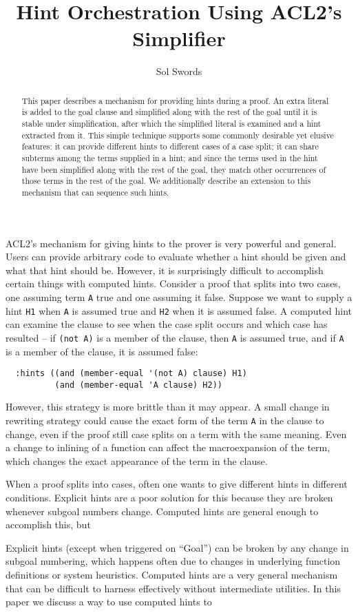 \documentclass[submission,copyright,creativecommons]{eptcs}
\title{Hint Orchestration Using ACL2's Simplifier}
\author{Sol Swords
\institute{Centaur Techology, Inc.\\
Austin, TX, USA}
\email{sswords@centtech.com}
}
\begin{document}
\maketitle

\begin{abstract}
  This paper describes a mechanism for providing hints during a proof.
  An extra literal is added to the goal clause and simplified along
  with the rest of the goal until it is stable under simplification,
  after which the simplified literal is examined and a hint extracted
  from it.  This simple technique supports some commonly desirable yet
  elusive features: it can provide different hints to different cases
  of a case split; it can share subterms among the terms supplied in a
  hint; and since the terms used in the hint have been simplified
  along with the rest of the goal, they match other occurrences of
  those terms in the rest of the goal.  We additionally describe an
  extension to this mechanism that can sequence such hints.

\end{abstract}


ACL2's mechanism for giving hints to the prover is very powerful and
general.  Users can provide arbitrary code to evaluate whether a hint
should be given and what that hint should be.  However, it is
surprisingly difficult to accomplish certain things with computed
hints.  Consider a proof that splits into two cases, one assuming term
\texttt{A} true and one assuming it false.  Suppose we want to supply
a hint \texttt{H1} when \texttt{A} is assumed true and
\texttt{H2} when it is assumed false.  A computed hint can examine the
clause to see when the case split occurs and which case has resulted
-- if \texttt{(not A)} is a member of the clause, then \texttt{A} is
assumed true, and if \texttt{A} is a member of the clause, it is
assumed false:
\begin{verbatim}
  :hints ((and (member-equal '(not A) clause) H1)
          (and (member-equal 'A clause) H2))
\end{verbatim}
However, this strategy is more brittle than it may appear.  A small
change in rewriting strategy could cause the exact form of the term
\texttt{A} in the clause to change, even if the proof still case
splits on a term with the same meaning.  Even a change to inlining of
a function can affect the macroexpansion of the term, which changes
the exact appearance of the term in the clause.




  When a proof splits
into cases, often one wants to give different hints in different
conditions.  Explicit hints are a poor solution for this because
they are broken whenever subgoal numbers change.  Computed hints are
general enough to accomplish this, but 


  Explicit hints
  (except when triggered on ``Goal'') can be broken by any change in
  subgoal numbering, which happens often due to changes in underlying
  function definitions or system heuristics.  Computed hints are a
  very general mechanism that can be difficult to harness effectively
  without intermediate utilities.  In this paper we discuss a way to use computed hints to 




\end{document}
